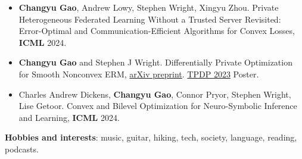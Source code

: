\documentclass[letterpaper,12pt]{article}
\begin{document}
\begin{itemize}[leftmargin=*, label={}]
  \item 	
  \textbf{Changyu Gao}, Andrew Lowy, Stephen Wright, Xingyu Zhou. Private Heterogeneous Federated Learning Without a Trusted Server Revisited: Error-Optimal and Communication-Efficient Algorithms for Convex Losses, \textbf{ICML} 2024.

  \item 
  \textbf{Changyu Gao} and Stephen J Wright. Differentially Private Optimization for Smooth Nonconvex ERM,
  \href{https://arxiv.org/abs/2302.04972}{arXiv preprint}. \href{https://tpdp.journalprivacyconfidentiality.org/2023/}{TPDP 2023} Poster.

  \item
  Charles Andrew Dickens, \textbf{Changyu Gao}, Connor Pryor, Stephen Wright, Lise Getoor.
  Convex and Bilevel Optimization for Neuro-Symbolic Inference and Learning, \textbf{ICML} 2024.

\end{itemize}
\vspace{0.2cm}
\textbf{Hobbies and interests}: music, guitar, hiking, tech, society, language, reading, podcasts.

\end{document}
